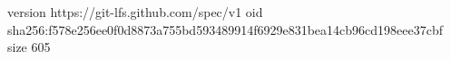 version https://git-lfs.github.com/spec/v1
oid sha256:f578e256ee0f0d8873a755bd593489914f6929e831bea14cb96cd198eee37cbf
size 605

